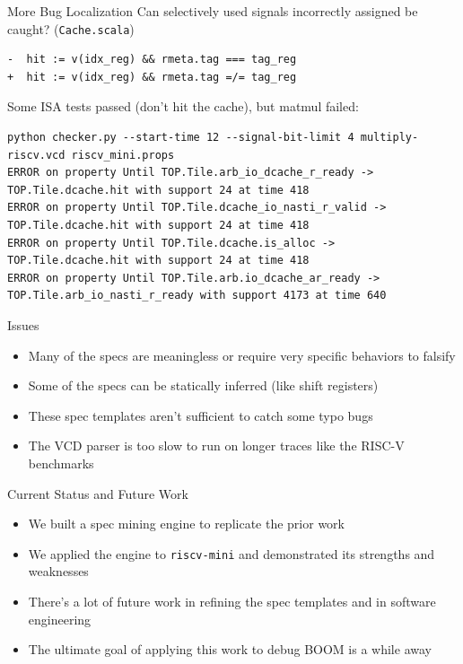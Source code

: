 \documentclass[12pt,aspectratio=169]{beamer}
\begin{document}
\begin{frame}[fragile]{More Bug Localization}
  Can selectively used signals incorrectly assigned be caught? (\texttt{Cache.scala})
  \begin{verbatim}
-  hit := v(idx_reg) && rmeta.tag === tag_reg
+  hit := v(idx_reg) && rmeta.tag =/= tag_reg
  \end{verbatim}

  Some ISA tests passed (don't hit the cache), but matmul failed:
  \begin{verbatim}
python checker.py --start-time 12 --signal-bit-limit 4 multiply-riscv.vcd riscv_mini.props
ERROR on property Until TOP.Tile.arb_io_dcache_r_ready -> TOP.Tile.dcache.hit with support 24 at time 418
ERROR on property Until TOP.Tile.dcache_io_nasti_r_valid -> TOP.Tile.dcache.hit with support 24 at time 418
ERROR on property Until TOP.Tile.dcache.is_alloc -> TOP.Tile.dcache.hit with support 24 at time 418
ERROR on property Until TOP.Tile.arb.io_dcache_ar_ready -> TOP.Tile.arb_io_nasti_r_ready with support 4173 at time 640
  \end{verbatim}
\end{frame}

\begin{frame}{Issues}
  \begin{itemize}
    \setlength\itemsep{0.75em}
    \item Many of the specs are meaningless or require very specific behaviors to falsify
    \item Some of the specs can be statically inferred (like shift registers)
    \item These spec templates aren't sufficient to catch some typo bugs
    \item The VCD parser is too slow to run on longer traces like the RISC-V benchmarks
  \end{itemize}
\end{frame}

\begin{frame}{Current Status and Future Work}
  \begin{itemize}
    \setlength\itemsep{0.75em}
    \item We built a spec mining engine to replicate the prior work
    \item We applied the engine to \texttt{riscv-mini} and demonstrated its strengths and weaknesses
    \item There's a lot of future work in refining the spec templates and in software engineering
    \item The ultimate goal of applying this work to debug BOOM is a while away
  \end{itemize}
\end{frame}

\end{document}
